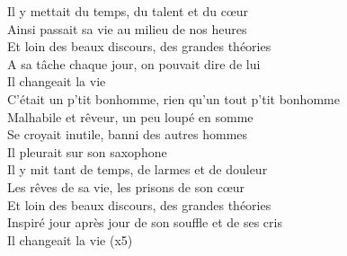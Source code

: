 \documentclass{novel}
\begin{document}
{\begin{minipage}[b][0.52\textheight][t]{\textwidth}
\begin{multicols}{2}
\small
Il y mettait du temps, du talent et du cœur \\
Ainsi passait sa vie au milieu de nos heures \\
Et loin des beaux discours, des grandes théories \\
A sa tâche chaque jour, on pouvait dire de lui \\
Il changeait la vie \footnotesize \\

\small
C'était un p'tit bonhomme, rien qu'un tout p'tit bonhomme \\
Malhabile et rêveur, un peu loupé en somme \\
Se croyait inutile, banni des autres hommes \footnotesize \\

\small
Il pleurait sur son saxophone \footnotesize \\

\small
Il y mit tant de temps, de larmes et de douleur \\
Les rêves de sa vie, les prisons de son cœur \\
Et loin des beaux discours, des grandes théories \\
Inspiré jour après jour de son souffle et de ses cris \\
Il changeait la vie (x5)
\end{multicols}
\end{minipage}
}


\newpage
\normalsize
\end{document}
